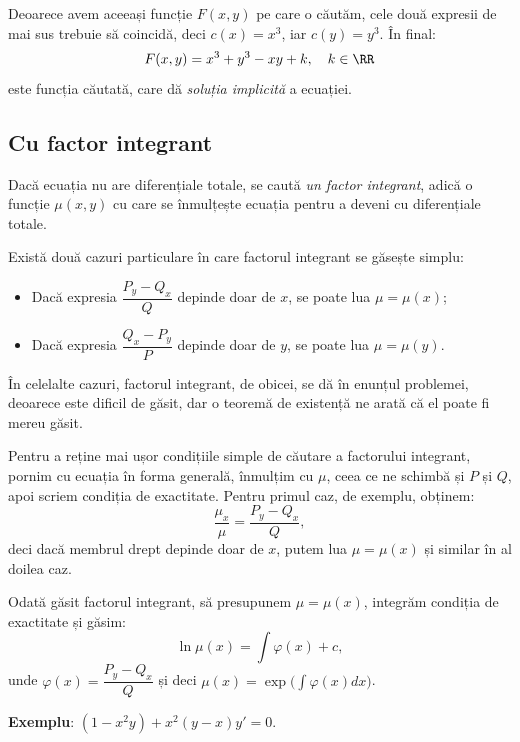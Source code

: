 Deoarece avem aceeași funcție $ F(x, y) $ pe care o căutăm, cele două expresii de mai
sus trebuie să coincidă, deci $ c(x) = x^3 $, iar $ c(y) = y^3 $. În final:
\[
  F(x, y) = x^3 + y^3 - xy + k, \quad k \in \RR
\]
este funcția căutată, care dă \emph{soluția implicită} a ecuației.



\subsection{Cu factor integrant}

Dacă ecuația nu are diferențiale totale, se caută \emph{un factor integrant},
adică o funcție $\mu(x, y)$ cu care se înmulțește ecuația pentru a deveni
cu diferențiale totale.

Există două cazuri particulare în care factorul integrant se găsește simplu:
\begin{itemize}
\item Dacă expresia $\dfrac{P_y - Q_x}{Q}$ depinde doar de $x$, se poate lua $\mu = \mu(x)$;
\item Dacă expresia $\dfrac{Q_x - P_y}{P}$ depinde doar de $y$, se poate lua $\mu = \mu(y)$.
\end{itemize}

În celelalte cazuri, factorul integrant, de obicei, se dă în enunțul problemei, deoarece este
dificil de găsit, dar o teoremă de existență ne arată că el poate fi mereu găsit.

\begin{remark}\label{rk:int}
  Pentru a reține mai ușor condițiile simple de căutare a factorului integrant, pornim cu
  ecuația în forma generală, înmulțim cu $\mu$, ceea ce ne schimbă și $P$ și $Q$, apoi scriem
  condiția de exactitate. Pentru primul caz, de exemplu, obținem:
  \[
    \frac{\mu_x}{\mu} = \frac{P_y - Q_x}{Q},
  \]
  deci dacă membrul drept depinde doar de $x$, putem lua $\mu = \mu(x)$ și similar în al doilea caz.
\end{remark}

Odată găsit factorul integrant, să presupunem $\mu = \mu(x)$, integrăm condiția de exactitate și găsim:
\[
  \ln \mu(x) = \int \varphi(x) + c,
\]
unde $\varphi(x) = \dfrac{P_y - Q_x}{Q}$ și deci $\mu(x) = \exp \Big( \int \varphi(x) dx \Big)$.

\vspace{0.5cm}

\textbf{Exemplu}: $(1 - x^2 y) + x^2 (y - x) y' = 0$.


